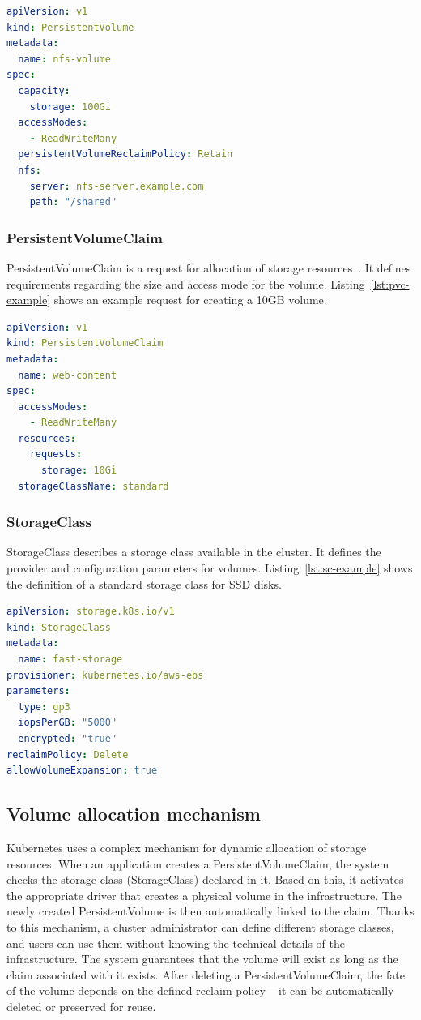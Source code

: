 \begin{lstlisting}[language=yaml,caption={Example PersistentVolume definition},label={lst:pv-example}]
apiVersion: v1
kind: PersistentVolume
metadata:
  name: nfs-volume
spec:
  capacity:
    storage: 100Gi
  accessModes:
    - ReadWriteMany
  persistentVolumeReclaimPolicy: Retain
  nfs:
    server: nfs-server.example.com
    path: "/shared"
\end{lstlisting}

\subsubsection{PersistentVolumeClaim}
PersistentVolumeClaim is a request for allocation of storage resources~\cite{k8s_persistent_volumes}.
It defines requirements regarding the size and access mode for the volume.
Listing~\ref{lst:pvc-example} shows an example request for creating a 10GB volume.

\begin{lstlisting}[language=yaml,caption={Example PersistentVolumeClaim definition},label={lst:pvc-example}]
apiVersion: v1
kind: PersistentVolumeClaim
metadata:
  name: web-content
spec:
  accessModes:
    - ReadWriteMany
  resources:
    requests:
      storage: 10Gi
  storageClassName: standard
\end{lstlisting}

\subsubsection{StorageClass}
StorageClass describes a storage class available in the cluster.
It defines the provider and configuration parameters for volumes.
Listing~\ref{lst:sc-example} shows the definition of a standard storage class for SSD disks.

\begin{lstlisting}[language=yaml,caption={Example StorageClass definition},label={lst:sc-example}]
apiVersion: storage.k8s.io/v1
kind: StorageClass
metadata:
  name: fast-storage
provisioner: kubernetes.io/aws-ebs
parameters:
  type: gp3
  iopsPerGB: "5000"
  encrypted: "true"
reclaimPolicy: Delete
allowVolumeExpansion: true
\end{lstlisting}

\subsection{Volume allocation mechanism}
Kubernetes uses a complex mechanism for dynamic allocation of storage resources.
When an application creates a PersistentVolumeClaim, the system checks the storage class (StorageClass) declared in it.
Based on this, it activates the appropriate driver that creates a physical volume in the infrastructure.
The newly created PersistentVolume is then automatically linked to the claim.
Thanks to this mechanism, a cluster administrator can define different storage classes, and users can use them without knowing the technical details of the infrastructure.
The system guarantees that the volume will exist as long as the claim associated with it exists.
After deleting a PersistentVolumeClaim, the fate of the volume depends on the defined reclaim policy -- it can be automatically deleted or preserved for reuse.

